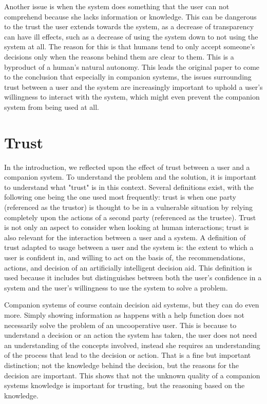 \documentclass[a4paper]{article}
\begin{document}
Another issue is when the system does something that the user can not comprehend because she lacks information or knowledge. This can be dangerous to the trust the user extends towards the system, as a decrease of transparency can have ill effects, such as a decrease of using the system down to not using the system at all. The reason for this is that humans tend to only accept someone's decisions only when the reasons behind them are clear to them. This is a byproduct of a human's natural autonomy. This leads the original paper to come to the conclusion that especially in companion systems, the issues surrounding trust between a user and the system are increasingly important to uphold a user's willingness to interact with the system, which might even prevent the companion system from being used at all.

\section{Trust}

In the introduction, we reflected upon the effect of trust between a user and a companion system. To understand the problem and the solution, it is important to understand what "trust" is in this context. Several definitions exist, with the following one being the one used most frequently: trust is when one party (referenced as the trustor) is thought to be in a vulnerable situation by relying completely upon the actions of a second party (referenced as the trustee). Trust is not only an aspect to consider when looking at human interactions; trust is also relevant for the interaction between a user and a system. A definition of trust adapted to usage between a user and the system is: the extent to which a user is confident in, and willing to act on the basis of, the recommendations, actions, and decision of an artificially intelligent decision aid\cite{htc}. This definition is used because it includes but distinguishes between both the user's confidence in a system and the user's willingness to use the system to solve a problem.

Companion systems of course contain decision aid systems, but they can do even more. Simply showing information as happens with a help function does not necessarily solve the problem of an uncooperative user. This is because to understand a decision or an action the system has taken, the user does not need an understanding of the concepts involved, instead she requires an understanding of the process that lead to the decision or action. That is a fine but important distinction; not the knowledge behind the decision, but the reasons for the decision are important. This shows that not the unknown quality of a companion systems knowledge is important for trusting, but the reasoning based on the knowledge.
\end{document}

